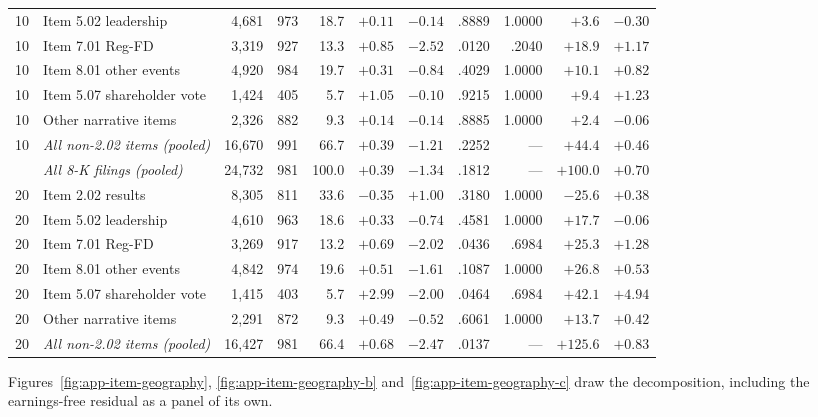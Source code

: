 \begin{table}[p]
\begin{tabular}{@{}rlrrrrrrrrr@{}}
10 & Item 5.02 leadership & 4{,}681 & 973 & 18.7 & $+0.11$\phantom{*} & $-0.14$ & .8889 & 1.0000 & $+3.6$ & $-0.30$ \\
10 & Item 7.01 Reg-FD & 3{,}319 & 927 & 13.3 & $+0.85$\phantom{*} & $-2.52$ & .0120 & .2040 & $+18.9$ & $+1.17$ \\
10 & Item 8.01 other events & 4{,}920 & 984 & 19.7 & $+0.31$\phantom{*} & $-0.84$ & .4029 & 1.0000 & $+10.1$ & $+0.82$ \\
10 & Item 5.07 shareholder vote & 1{,}424 & 405 & 5.7 & $+1.05$\phantom{*} & $-0.10$ & .9215 & 1.0000 & $+9.4$ & $+1.23$ \\
10 & Other narrative items & 2{,}326 & 882 & 9.3 & $+0.14$\phantom{*} & $-0.14$ & .8885 & 1.0000 & $+2.4$ & $-0.06$ \\
10 & \emph{All non-2.02 items (pooled)} & 16{,}670 & 991 & 66.7 & $+0.39$\phantom{*} & $-1.21$ & .2252 & --- & $+44.4$ & $+0.46$ \\
\addlinespace
20 & \emph{All 8-K filings (pooled)} & 24{,}732 & 981 & 100.0 & $+0.39$\phantom{*} & $-1.34$ & .1812 & --- & $+100.0$ & $+0.70$ \\
20 & Item 2.02 results & 8{,}305 & 811 & 33.6 & $-0.35$\phantom{*} & $+1.00$ & .3180 & 1.0000 & $-25.6$ & $+0.38$ \\
20 & Item 5.02 leadership & 4{,}610 & 963 & 18.6 & $+0.33$\phantom{*} & $-0.74$ & .4581 & 1.0000 & $+17.7$ & $-0.06$ \\
20 & Item 7.01 Reg-FD & 3{,}269 & 917 & 13.2 & $+0.69$\phantom{*} & $-2.02$ & .0436 & .6984 & $+25.3$ & $+1.28$ \\
20 & Item 8.01 other events & 4{,}842 & 974 & 19.6 & $+0.51$\phantom{*} & $-1.61$ & .1087 & 1.0000 & $+26.8$ & $+0.53$ \\
20 & Item 5.07 shareholder vote & 1{,}415 & 403 & 5.7 & $+2.99$\phantom{*} & $-2.00$ & .0464 & .6984 & $+42.1$ & $+4.94$ \\
20 & Other narrative items & 2{,}291 & 872 & 9.3 & $+0.49$\phantom{*} & $-0.52$ & .6061 & 1.0000 & $+13.7$ & $+0.42$ \\
20 & \emph{All non-2.02 items (pooled)} & 16{,}427 & 981 & 66.4 & $+0.68$\phantom{*} & $-2.47$ & .0137 & --- & $+125.6$ & $+0.83$ \\
\bottomrule
\end{tabular}
\end{table}

Figures~\ref{fig:app-item-geography}, \ref{fig:app-item-geography-b} and~\ref{fig:app-item-geography-c} draw the
decomposition, including the earnings-free residual as a panel of its own.

